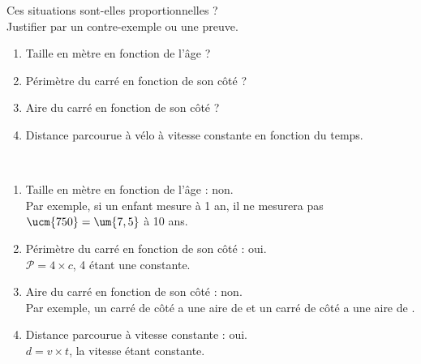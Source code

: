 \exercicesbase

\begin{colonne*exercice}


\begin{exercice} %
   Ces situations sont-elles proportionnelles ? \\
   Justifier par un contre-exemple ou une preuve.
   \begin{enumerate}
      \item Taille en mètre en fonction de l'âge ?
      \item Périmètre du carré en fonction de son côté ?
      \item Aire du carré en fonction de son côté ?
      \item Distance parcourue à vélo à vitesse constante en fonction du temps.
   \end{enumerate}
\end{exercice}

\begin{corrige}
   \ \\ [-5mm]
   \begin{enumerate}
      \item Taille en mètre en fonction de l'âge : {\blue non}. \\
         Par exemple, si un enfant mesure  à 1 an, il ne mesurera pas $\ucm{750} =\um{7,5}$ à 10 ans.
      \item Périmètre du carré en fonction de son côté : {\blue oui}. \\
         $\mathcal{P} =4\times c$, 4 étant une constante.
      \item Aire du carré en fonction de son côté  : {\blue non}. \\
         Par exemple, un carré de côté  a une aire de  et un carré de côté  a une aire de .
      \item Distance parcourue à vitesse constante : {\blue oui}. \\
         $d =v\times t$, la vitesse étant constante.
   \end{enumerate}
\end{corrige}

\bigskip



\end{colonne*exercice}
